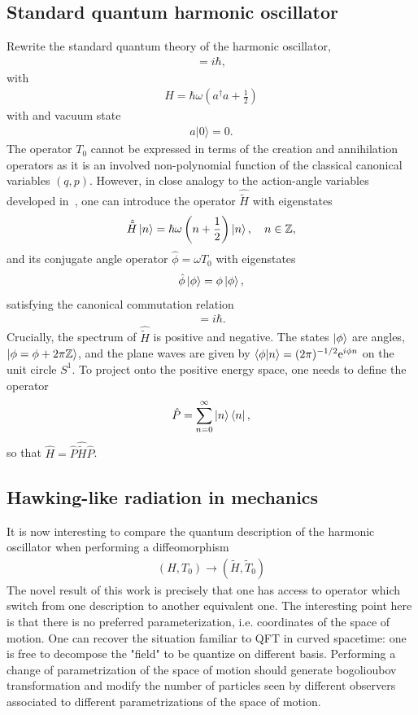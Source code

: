 \documentclass[onecolumn,notitlepage,superscriptaddress, nofootinbib,nobibnotes, aps,prd,10pt]{revtex4-1}%
\def\ra{\rangle }
\def\be{\begin{eqnarray}}
\def\ee{\end{eqnarray}}
\begin{document}
\subsection{Standard quantum harmonic oscillator}

Rewrite the standard quantum theory of the harmonic oscillator,
\be
[a, a^{\dagger}] = i \hbar,
\ee
with
\be
H = \hbar \omega \left( a^\dagger a + \frac{1}{2}\right) 
\ee
with  and vacuum state
\be
a |0 \ra = 0.
\ee
The operator $T_0$ cannot be expressed in terms of the creation and annihilation operators as it is an involved non-polynomial function of the classical canonical variables $(q,p)$. However, in close analogy to the action-angle variables developed in~\cite{Augustin1979}, one can introduce the operator $\hat{\tilde{H}}$  with eigenstates 
\be
\hat{\tilde{H}}\ket{n} = \hbar\omega\left(n+\frac{1}{2}\right)\ket{n}, \quad n\in\mathbb{Z},
\ee
and its conjugate angle operator $\hat{\phi} = \omega \hat{T}_0$ with eigenstates
\be
\hat{\phi} \ket{\phi} = \phi \ket{\phi},
\ee
satisfying the canonical commutation relation
\be
[\hat{\phi},\hat{\tilde{H}}/\omega] = i \hbar.
\ee
Crucially, the spectrum of $\hat{\tilde{H}}$ is positive and negative. The states $\ket{\phi}$ are angles, $\ket{\phi = \phi+2\pi\mathbb{Z}}$, and the plane waves are given by $\braket{\phi}{n} = (2\pi)^{-1/2}\mathrm{e}^{i\phi n}$ on the unit circle $S^1$. To project onto the positive energy space, one needs to define the operator
\be
\hat{P} = \sum_{n = 0}^{\infty}\ket{n}\bra{n},
\ee
so that $\hat{H} = \hat{P}\hat{\tilde{H}}\hat{P}$.




\subsection{Hawking-like radiation in mechanics}

It is now interesting to compare the quantum description of the harmonic oscillator when performing a diffeomorphism 
\be
(H, T_0) \rightarrow  (\tilde{H}, \tilde{T}_0)
\ee
The novel result of this work is precisely that one has access to operator which switch from one description to another equivalent one. The interesting point here is that there is no preferred parameterization, i.e. coordinates of the space of motion. One can recover the situation familiar to QFT in curved spacetime: one is free to decompose the "field" to be quantize on different basis. Performing a change of parametrization of the space of motion should generate bogolioubov transformation and modify the number of particles seen by different observers associated to different parametrizations of the space of motion.
\end{document}
